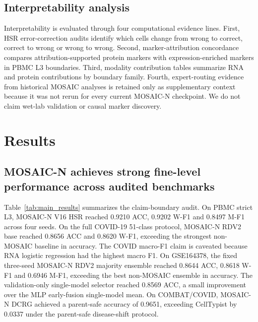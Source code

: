 \documentclass[unnumsec,webpdf,contemporary,large,numbered]{oup-authoring-template}
\begin{document}
\subsection{Interpretability analysis}

Interpretability is evaluated through four computational evidence lines. First, HSR error-correction audits identify which cells change from wrong to correct, correct to wrong or wrong to wrong. Second, marker-attribution concordance compares attribution-supported protein markers with expression-enriched markers in PBMC L3 boundaries. Third, modality contribution tables summarize RNA and protein contributions by boundary family. Fourth, expert-routing evidence from historical MOSAIC analyses is retained only as supplementary context because it was not rerun for every current MOSAIC-N checkpoint. We do not claim wet-lab validation or causal marker discovery.

\section{Results}

\subsection{MOSAIC-N achieves strong fine-level performance across audited benchmarks}

Table~\ref{tab:main_results} summarizes the claim-boundary audit. On PBMC strict L3, MOSAIC-N V16 HSR reached 0.9210 ACC, 0.9202 W-F1 and 0.8497 M-F1 across four seeds. On the full COVID-19 51-class protocol, MOSAIC-N RDV2 base reached 0.8656 ACC and 0.8620 W-F1, exceeding the strongest non-MOSAIC baseline in accuracy. The COVID macro-F1 claim is caveated because RNA logistic regression had the highest macro F1. On GSE164378, the fixed three-seed MOSAIC-N RDV2 majority ensemble reached 0.8644 ACC, 0.8618 W-F1 and 0.6946 M-F1, exceeding the best non-MOSAIC ensemble in accuracy. The validation-only single-model selector reached 0.8569 ACC, a small improvement over the MLP early-fusion single-model mean. On COMBAT/COVID, MOSAIC-N DCRG achieved a parent-safe accuracy of 0.9651, exceeding CellTypist by 0.0337 under the parent-safe disease-shift protocol.
\end{document}

